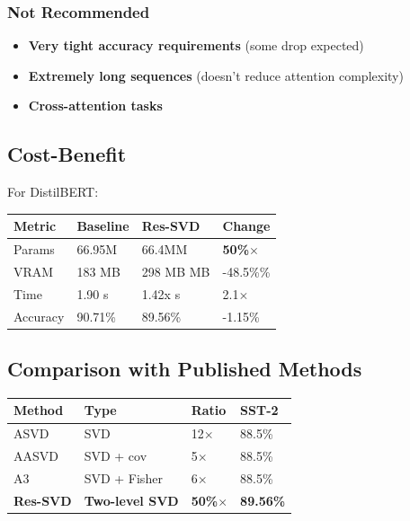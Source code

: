 \subsubsection{Not Recommended}

\begin{itemize}
\item \textbf{Very tight accuracy requirements} (some drop expected)
\item \textbf{Extremely long sequences} (doesn't reduce attention complexity)
\item \textbf{Cross-attention tasks}

\end{itemize}
\subsection{Cost-Benefit}

For DistilBERT:

\begin{table}[H]
\centering
\small
\begin{tabular}{llll}
\toprule
\textbf{Metric} & \textbf{Baseline} & \textbf{Res-SVD} & \textbf{Change} \\
\midrule
Params & 66.95M & 66.4MM & \textbf{50\%$\times$} \\
VRAM & 183 MB & 298 MB MB & -48.5\%\% \\
Time & 1.90 s & 1.42x s & 2.1$\times$ \\
Accuracy & 90.71\% & 89.56\% & -1.15\% \\
\bottomrule
\end{tabular}
\end{table}

\subsection{Comparison with Published Methods}

\begin{table}[H]
\centering
\small
\begin{tabular}{llll}
\toprule
\textbf{Method} & \textbf{Type} & \textbf{Ratio} & \textbf{SST-2} \\
\midrule
ASVD & SVD & 12$\times$ & 88.5\% \\
AASVD & SVD + cov & 5$\times$ & 88.5\% \\
A3 & SVD + Fisher & 6$\times$ & 88.5\% \\
\textbf{Res-SVD} & \textbf{Two-level SVD} & \textbf{50\%$\times$} & \textbf{89.56\%} \\
\bottomrule
\end{tabular}
\end{table}


